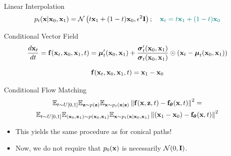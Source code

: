 \documentclass{beamer}
\renewcommand{\eqpause}{}
\begin{document}
\begin{frame}{Linear Interpolation}
	\vspace{-0.3cm}
	\[
		p_t(\mathbf{x} | \mathbf{x}_0, \mathbf{x}_1) = \mathcal{N}\left(t \mathbf{x}_1 + (1 - t) \mathbf{x}_0, \epsilon^2 \mathbf{I}\right); \quad {\color{teal}\mathbf{x}_t = t \mathbf{x}_1 + (1 - t) \mathbf{x}_0}
	\]
	\vspace{-0.5cm}
	\begin{block}{Conditional Vector Field}
		\vspace{-0.5cm}
		\[
			 \frac{d\mathbf{x}_t}{dt} = \mathbf{f}(\mathbf{x}_t, \mathbf{x}_0, \mathbf{x}_1, t) =  \boldsymbol{\mu}_t'(\mathbf{x}_0, \mathbf{x}_1) + \frac{\boldsymbol{\sigma}_t'(\mathbf{x}_0, \mathbf{x}_1)}{\boldsymbol{\sigma}_t(\mathbf{x}_0, \mathbf{x}_1)} \odot (\mathbf{x}_t - \boldsymbol{\mu}_t(\mathbf{x}_0, \mathbf{x}_1))
		\]
		\eqpause
		\vspace{-0.5cm}
		\[
			\mathbf{f}(\mathbf{x}_t, \mathbf{x}_0, \mathbf{x}_1, t) = \mathbf{x}_1 - \mathbf{x}_0
		\]
		\vspace{-0.7cm}
	\end{block}
	\eqpause
	\begin{block}{Conditional Flow Matching}
		\vspace{-0.7cm}
		\begin{multline*}
			\mathbb{E}_{t \sim U[0, 1]} \mathbb{E}_{\mathbf{z} \sim p(\mathbf{z})} \mathbb{E}_{\mathbf{x} \sim p_t(\mathbf{x} | \mathbf{z})}\left\| \mathbf{f}(\mathbf{x}, \mathbf{z}, t) - \mathbf{f}_{\boldsymbol{\theta}}(\mathbf{x}, t) \right\|^2 = \\
		 \mathbb{E}_{t \sim U[0, 1]} \mathbb{E}_{(\mathbf{x}_0, \mathbf{x}_1) \sim p(\mathbf{x}_0, \mathbf{x}_1)} \mathbb{E}_{\mathbf{x} \sim p_t(\mathbf{x} | \mathbf{x}_0, \mathbf{x}_1)} \left\| (\mathbf{x}_1 - \mathbf{x}_0) - \mathbf{f}_{\boldsymbol{\theta}}(\mathbf{x}, t) \right\|^2
		\end{multline*}
	\end{block}
	\eqpause
	\vspace{-0.3cm}
	\begin{itemize}
		\item This yields the same procedure as for conical paths!
		\item Now, we do not require that $p_0(\mathbf{x})$ is necessarily $\mathcal{N}(0, \mathbf{I})$.
	\end{itemize} 
\end{frame}
\end{document}
